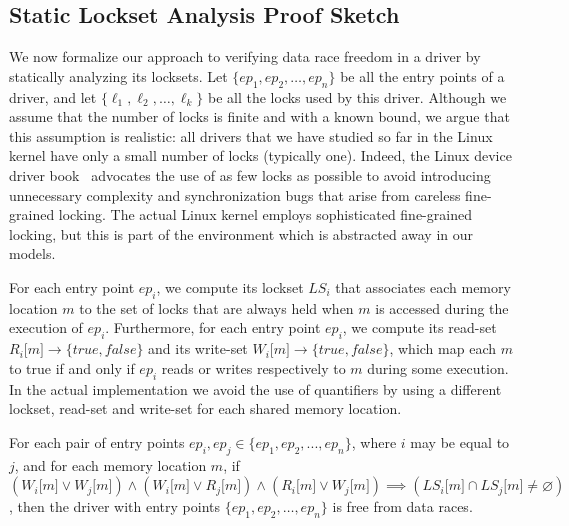 \subsection{Static Lockset Analysis Proof Sketch}
\label{whoop:proof}

We now formalize our approach to verifying data race freedom in a driver by statically analyzing its locksets. Let $\{\mathit{ep}_{1}, \mathit{ep}_{2}, \dotsc, \mathit{ep}_{n}\}$ be all the entry points of a driver, and let $\{\ell_{1}, \ell_{2}, \dotsc, \ell_{k}\}$ be all the locks used by this driver. Although we assume that the number of locks is finite and with a known bound, we argue that this assumption is realistic: all drivers that we have studied so far in the Linux kernel have only a small number of locks (typically one). Indeed, the Linux device driver book~\cite{corbet2005linux} advocates the use of as few locks as possible to avoid introducing unnecessary complexity and synchronization bugs that arise from careless fine-grained locking. The actual Linux kernel employs sophisticated fine-grained locking, but this is part of the environment which is abstracted away in our models.

For each entry point $\mathit{ep}_{i}$, we compute its lockset $\mathit{LS}_{i}$ that associates each memory location $m$ to the set of locks that are always held when $m$ is accessed during the execution of $\mathit{ep}_{i}$. Furthermore, for each entry point $\mathit{ep}_{i}$, we compute its read-set $R_{i}\lbrack m\rbrack \rightarrow \{true, false\}$ and its write-set $W_{i}\lbrack m\rbrack \rightarrow \{true, false\}$, which map each $m$ to true if and only if $\mathit{ep}_{i}$ reads or writes respectively to $m$ during some execution. In the actual implementation we avoid the use of quantifiers by using a different lockset, read-set and write-set for each shared memory location.

\begin{theorem}
\label{theorem:locksets}
For each pair of entry points $\mathit{ep}_{i}, \mathit{ep}_{j}\in \{\mathit{ep}_{1}, \mathit{ep}_{2}, ..., \mathit{ep}_{n}\}$, where $i$ may be equal to $j$, and for each memory location $m$, if $(W_{i}\lbrack m\rbrack \vee W_{j}\lbrack m\rbrack) \wedge (W_{i}\lbrack m\rbrack \vee R_{j}\lbrack m\rbrack) \wedge (R_{i}\lbrack m\rbrack \vee W_{j}\lbrack m\rbrack) \implies (\mathit{LS}_{i}\lbrack m\rbrack \cap \mathit{LS}_{j}\lbrack m\rbrack \not= \varnothing)$, then the driver with entry points $\{\mathit{ep}_{1}, \mathit{ep}_{2}, \dotsc, \mathit{ep}_{n}\}$ is free from data races.
\end{theorem}

